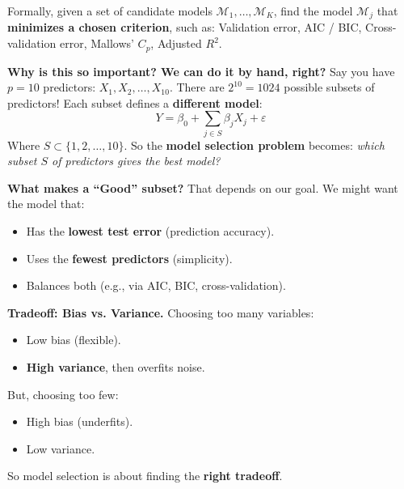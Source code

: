 \highspace
Formally, given a set of candidate models $\mathcal{M}_1, \dots, \mathcal{M}_K$, find the model $\mathcal{M}_j$ that \textbf{minimizes a chosen criterion}, such as: Validation error, AIC / BIC, Cross-validation error, Mallows' $C_p$, Adjusted $R^2$.

\highspace
\textcolor{Green3}{ \textbf{Why is this so important? We can do it by hand, right?}} Say you have $p = 10$ predictors: $X_1, X_2, \dots, X_{10}$. There are $2^{10} = 1024$ possible subsets of predictors! Each subset defines a \textbf{different model}:
\begin{equation*}
    Y = \beta_0 + \sum_{j \in S} \beta_j X_j + \varepsilon
\end{equation*}
Where $S \subset \{1, 2, \dots, 10\}$. So the \textbf{model selection problem} becomes: \emph{which subset $S$ of predictors gives the best model?}

\highspace
\textcolor{Green3}{ \textbf{What makes a ``Good'' subset?}} That depends on our goal. We might want the model that:
\begin{itemize}
    \item Has the \textbf{lowest test error} (prediction accuracy).
    \item Uses the \textbf{fewest predictors} (simplicity).
    \item Balances both (e.g., via AIC, BIC, cross-validation).
\end{itemize}

\highspace
\textcolor{Green3}{ \textbf{Tradeoff: Bias vs. Variance.}} Choosing too many variables:
\begin{itemize}
    \item[\textcolor{Green3}{\faIcon{check}}] Low bias (flexible).
    \item[\textcolor{Red2}{\faIcon{times}}] \textbf{High variance}, then overfits noise.
\end{itemize}
But, choosing too few:
\begin{itemize}
    \item[\textcolor{Red2}{\faIcon{times}}] High bias (underfits).
    \item[\textcolor{Green3}{\faIcon{check}}] Low variance.
\end{itemize}
So model selection is about finding the \textbf{right tradeoff}.

